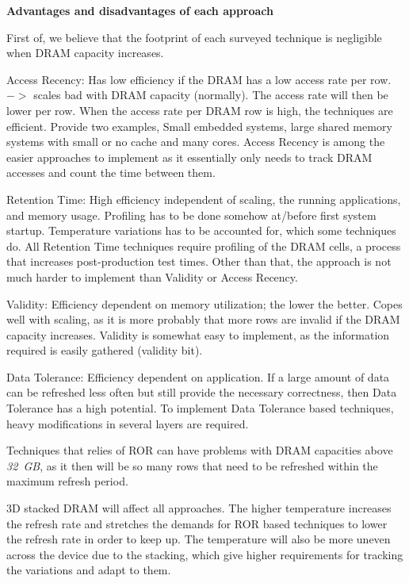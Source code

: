 

\textbf{Advantages and disadvantages of each approach}

First of, we believe that the footprint of each surveyed technique is negligible when DRAM capacity increases.

Access Recency:
Has low efficiency if the DRAM has a low access rate per row.
$->$ scales bad with DRAM capacity (normally). The access rate will then be lower per row.
When the access rate per DRAM row is high, the techniques are efficient. Provide two examples, Small embedded systems, large shared memory systems with small or no cache and many cores. 
Access Recency is among the easier approaches to implement as it essentially only needs to track DRAM accesses and count the time between them.

Retention Time:
High efficiency independent of scaling, the running applications, and memory usage. Profiling has to be done somehow at/before first system startup. Temperature variations has to be accounted for, which some techniques do.
All Retention Time techniques require profiling of the DRAM cells, a process that increases post-production test times. Other than that, the approach is not much harder to implement than Validity or Access Recency.

Validity:
Efficiency dependent on memory utilization; the lower the better. Copes well with scaling, as it is more probably that more rows are invalid if the DRAM capacity increases. 
Validity is somewhat easy to implement, as the information required is easily gathered (validity bit).

Data Tolerance:
Efficiency dependent on application. If a large amount of data can be refreshed less often but still provide the necessary correctness, then Data Tolerance has a high potential. 
To implement Data Tolerance based techniques, heavy modifications in several layers are required.


Techniques that relies of ROR can have problems with DRAM capacities above \textit{32~GB}, as it then will be so many rows that need to be refreshed within the maximum refresh period. 

3D stacked DRAM will affect all approaches. The higher temperature increases the refresh rate and stretches the demands for ROR based techniques to lower the refresh rate in order to keep up. The temperature will also be more uneven across the device due to the stacking, which give higher requirements for tracking the variations and adapt to them.

